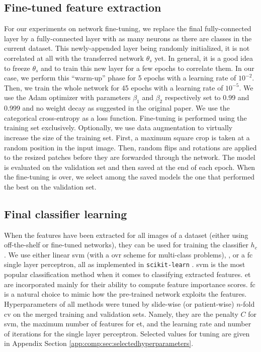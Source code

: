 \subsection{Fine-tuned feature extraction}
\label{ssec:comp:meth_fine_tuning}

For our experiments on network fine-tuning, we replace the final fully-connected layer by a fully-connected layer with as many neurons as there are classes in the current dataset. This newly-appended layer being randomly initialized, it is not correlated at all with the transferred network $\theta_s$ yet. In general, it is a good idea to freeze $\theta_s$ and to train this new layer for a few epochs to correlate them. In our case, we perform this ``warm-up'' phase for 5 epochs with a learning rate of $10^{-2}$. Then, we train the whole network for 45 epochs with a learning rate of $10^{-5}$. We use the Adam optimizer \cite{kingma2014adam} with parameters $\beta_1$ and $\beta_2$ respectively set to 0.99 and 0.999 and no weight decay as suggested in the original paper. We use the categorical cross-entropy as a loss function. Fine-tuning is performed using the training set exclusively. Optionally, we use data augmentation to virtually increase the size of the training set. First, a maximum square crop is taken at a random position in the input image. %
Then, random flips and rotations are applied to the resized patches before they are forwarded through the network. The model is evaluated on the validation set and then saved at the end of each epoch. When the fine-tuning is over, we select among the saved models the one that performed the best on the validation set.

\subsection{Final classifier learning}
\label{ssec:comp:final_classifier}
When the features have been extracted for all images of a dataset (either using off-the-shelf or fine-tuned networks), they can be used for training the classifier $h_c$. 
We use either linear \acrshort{svm} \cite{boser1992training} (with a \acrlong{ovr} scheme for multi-class problems),  \cite{geurts2006extremely}, or a \acrlong{fc} single layer perceptron, all as implemented in \texttt{scikit-learn} \cite{scikit-learn}. \acrshort{svm} is the most popular classification method when it comes to classifying extracted features. \acrshort{et} are incorporated mainly for their ability to compute feature importance scores. \acrshort{fc} is a natural choice to mimic how the pre-trained network exploits the features. Hyperparameters of all methods were tuned by slide-wise (or patient-wise) $n$-fold \acrlong{cv} on the merged training and validation sets. Namely, they are the penalty $C$ for \acrshort{svm}, the maximum number of features for \acrshort{et}, and the learning rate and number of iterations for the single layer perceptron. Selected values for tuning are given in Appendix Section \ref{app:comp:sec:selectedhyperparameters}.

